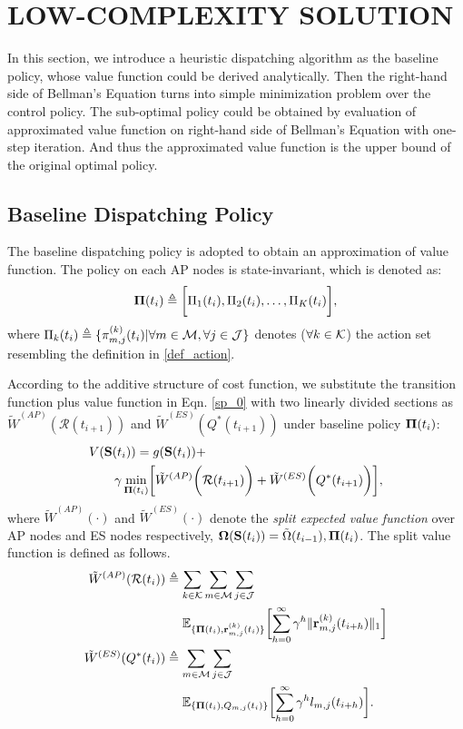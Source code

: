 \section{LOW-COMPLEXITY SOLUTION}
In this section, we introduce a heuristic dispatching algorithm as the baseline policy, whose value function could be derived analytically.
Then the right-hand side of Bellman's Equation turns into simple minimization problem over the control policy. The sub-optimal policy could be obtained by evaluation of approximated value function on right-hand side of Bellman's Equation with one-step iteration. And thus the approximated value function is the upper bound of the original optimal policy.

\subsection{Baseline Dispatching Policy}
The baseline dispatching policy is adopted to obtain an approximation of value function. The policy on each AP nodes is state-invariant, which is denoted as:
\begin{align}
    \boldsymbol{\Pi}(t_i) \triangleq \bigg[\Pi_1(t_i), \Pi_2(t_i), \dots, \Pi_K(t_i)\bigg],
\end{align}
where $\Pi_k(t_i) \triangleq \{\pi^{(k)}_{m,j}(t_{i}) | \forall m\in\mathcal{M},\forall j\in\mathcal{J}\}$ denotes ($\forall k\in\mathcal{K}$) the action set resembling the definition in \ref{def_action}.

According to the additive structure of cost function, we substitute the transition function plus value function in Eqn. \ref{sp_0} with two linearly divided sections as $\tilde{W}^{(AP)}(\mathcal{R}(t_{i+1}))$ and $\tilde{W}^{(ES)}(Q^*(t_{i+1}))$ under baseline policy $\boldsymbol{\Pi}(t_{i})$:
\begin{align}
    &V(\Stat(t_{i})) = g(\Stat(t_{i})) +
    \nonumber\\
    &~~~~~~\gamma \min_{\BaseLine(t_i)} \Bracket{ \tilde{W}^{(AP)}\Paren{\mathcal{R}(t_{i+1})} + \tilde{W}^{(ES)}\Paren{Q^*(t_{i+1})} },
\end{align}
where $\tilde{W}^{(AP)}(\cdot)$ and $\tilde{W}^{(ES)}(\cdot)$ denote the \emph{split expected value function} over AP nodes and ES nodes respectively, $\boldsymbol{\Omega}(\mathbf{S}(t_{i})) = \tilde{\Omega}(t_{i-1}), \boldsymbol{\Pi}(t_i)$. The split value function is defined as follows.
\begin{align}
    \tilde{W}^{(AP)}(\mathcal{R}(t_{i})) &\define \sum_{k\in\apSet}\sum_{m\in\esSet}\sum_{j\in\jSpace}
        \nonumber\\
        &~~~~\mathbb{E}_{\{\BaseLine(t_i), \vec{r}^{(k)}_{m,j}(t_{i})\}}\Bracket{
            \sum_{h=0}^{\infty} \gamma^{h} \Inorm{\vec{r}^{(k)}_{m,j}(t_{i+h})}
        }
    \\
    \tilde{W}^{(ES)}(Q^*(t_{i})) &\define \sum_{m\in\esSet}\sum_{j\in\jSpace}
        \nonumber\\
        &~~~~\mathbb{E}_{\{\BaseLine(t_i), Q_{m,j}(t_{i})\}}\Bracket{
            \sum_{h=0}^{\infty} \gamma^{h} l_{m,j}(t_{i+h})
        }.
\end{align}
        
